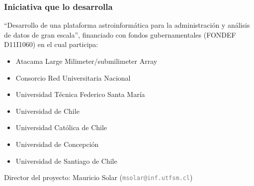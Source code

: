 \begin{frame}
\frametitle{Iniciativa que lo desarrolla}

``Desarrollo de una plataforma astroinformática para la administración y
análisis de datos de gran escala'', financiado con fondos gubernamentales
(FONDEF D11I1060) en el cual participa:
\vspace{0.3cm}
\begin{itemize}
\setlength{\itemindent}{1.0cm}
    \item Atacama Large Milimeter/submilimeter Array
    \item Consorcio Red Universitaria Nacional
    \item Universidad Técnica Federico Santa María
    \item Universidad de Chile
    \item Universidad Católica de Chile
    \item Universidad de Concepción
    \item Universidad de Santiago de Chile
\end{itemize}
\vspace{0.5cm}
Director del proyecto: Mauricio Solar (\small{\textcolor{gray}{\texttt{msolar@inf.utfsm.cl}}})

\end{frame}
